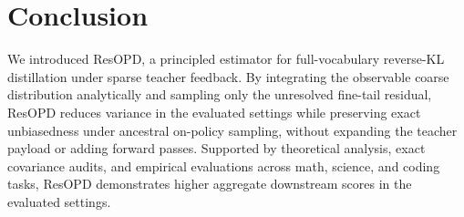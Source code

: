 \FloatBarrier
\section{Conclusion}

We introduced ResOPD, a principled estimator for full-vocabulary reverse-KL distillation under sparse teacher feedback. By integrating the observable coarse distribution analytically and sampling only the unresolved fine-tail residual, ResOPD reduces variance in the evaluated settings while preserving exact unbiasedness under ancestral on-policy sampling, without expanding the teacher payload or adding forward passes. Supported by theoretical analysis, exact covariance audits, and empirical evaluations across math, science, and coding tasks, ResOPD demonstrates higher aggregate downstream scores in the evaluated settings.

